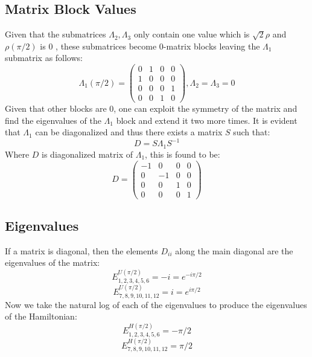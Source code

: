 \subsection{Matrix Block Values}
Given that the submatrices $\Lambda_{2}, \Lambda_{3}$ only contain one value which is $\sqrt{2}\rho$ and $\rho(\pi/2)$ is $0$ , these submatrices become $0$-matrix blocks leaving the $\Lambda_{1}$ submatrix as follows:
\begin{equation}
    \Lambda_{1}(\pi/2) = \begin{pmatrix} 0 & 1 & 0 & 0 \\ 1 & 0 & 0 & 0 \\ 0 & 0 & 0 & 1 \\ 0 & 0 & 1 & 0 \end{pmatrix},  \Lambda_{2} = \Lambda_{3} = 0 
\end{equation}
Given that other blocks are 0, one can exploit the symmetry of the matrix and find the eigenvalues of the $\Lambda_{1}$ block and extend it two more times. \newline 
It is evident that $\Lambda_{1}$ can be diagonalized and thus there exists a matrix $S$ such that:
\begin{equation}
    D = S\Lambda_{1}S^{-1}
\end{equation}
Where $D$ is diagonalized matrix of $\Lambda_{1}$, this is found to be:
\begin{equation}
    D = \begin{pmatrix} -1& 0 & 0 & 0 \\ 0 & -1 & 0 & 0 \\ 0 & 0 & 1 & 0 \\ 0 & 0 & 0 & 1 \end{pmatrix}
\end{equation}
\subsection{Eigenvalues}
If a matrix is diagonal, then the elements $D_{ii}$ along the main diagonal are the eigenvalues of the matrix:
\begin{equation}
    E_{1,2,3,4,5,6}^{U(\pi/2)} = -i = e^{-i\pi/2}
\end{equation}
\begin{equation}
    E_{7,8,9,10,11,12}^{U(\pi/2)} = i = e^{i\pi/2}
\end{equation}
Now we take the natural log of each of the eigenvalues to produce the eigenvalues of the Hamiltonian:
\begin{equation}
    E_{1,2,3,4,5,6}^{H(\pi/2)} = -\pi/2
\end{equation}
\begin{equation}
    E_{7,8,9,10,11,12}^{H(\pi/2)} = \pi/2
\end{equation}
